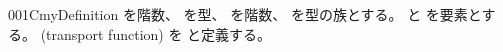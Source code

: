 \documentclass[index]{subfiles}
\begin{document}
\begin{myBlock}{001C}{myDefinition}
  を階数、
  を型、
  を階数、
  を型の族とする。
  と
  を要素とする。
  (transport function)
  を
  と定義する。
\end{myBlock}
\end{document}
